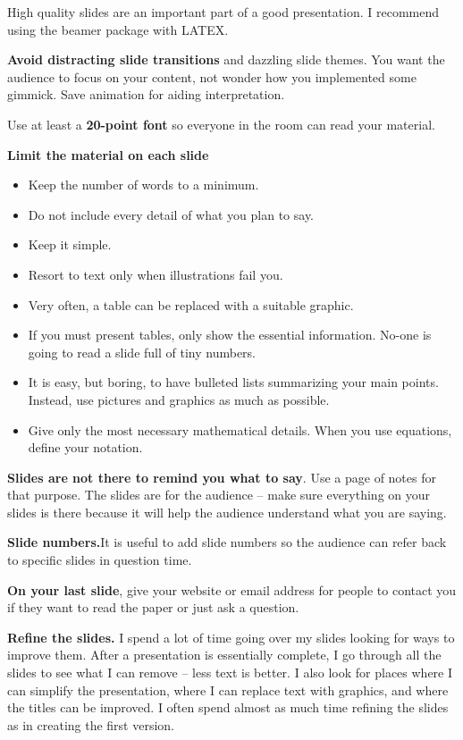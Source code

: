 \documentclass[
]{book}
\providecommand{\tightlist}{%
  \setlength{\itemsep}{0pt}\setlength{\parskip}{0pt}}
\begin{document}
High quality slides are an important part of a good
presentation. I recommend using the beamer package
with LATEX.

\textbf{Avoid distracting slide transitions} and dazzling
slide themes. You want the audience to focus on your
content, not wonder how you implemented some
gimmick. Save animation for aiding interpretation.

Use at least a \textbf{20-point font} so everyone in the
room can read your material.

\textbf{Limit the material on each slide}

\begin{itemize}
\tightlist
\item
  Keep the number of words to a minimum.
\item
  Do not include every detail of what you plan to say.
\item
  Keep it simple.
\item
  Resort to text only when illustrations fail you.
\item
  Very often, a table can be replaced with a suitable
  graphic.
\item
  If you must present tables, only show the essential
  information. No-one is going to read a slide full
  of tiny numbers.
\item
  It is easy, but boring, to have bulleted lists summarizing
  your main points. Instead, use pictures and
  graphics as much as possible.
\item
  Give only the most necessary mathematical details.
  When you use equations, define your notation.
\end{itemize}

\textbf{Slides are not there to remind you what to say}.
Use a page of notes for that purpose. The slides are
for the audience -- make sure everything on your
slides is there because it will help the audience understand
what you are saying.

\textbf{Slide numbers.}It is useful to add slide numbers so the audience
can refer back to specific slides in question time.

\textbf{On your last slide}, give your website or email address
for people to contact you if they want to read
the paper or just ask a
question.

\textbf{Refine the slides.} I spend a lot of time going over my slides looking
for ways to improve them. After a presentation is essentially
complete, I go through all the slides to see
what I can remove -- less text is better. I also look for
places where I can simplify the presentation, where
I can replace text with graphics, and where the titles
can be improved. I often spend almost as much time
refining the slides as in creating the first version.
\end{document}
